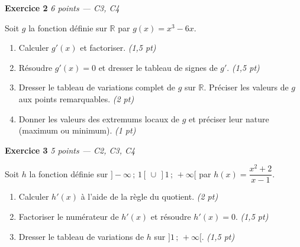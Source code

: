 \bigskip

\textbf{Exercice 2} \hfill \textit{6 points — C3, C4}

Soit $g$ la fonction définie sur $\mathbb{R}$ par $g(x) = x^3 - 6x$.

\begin{enumerate}
  \item Calculer $g'(x)$ et factoriser. \hfill \textit{(1,5 pt)}
  \item Résoudre $g'(x) = 0$ et dresser le tableau de signes de $g'$. \hfill \textit{(1,5 pt)}
  \item Dresser le tableau de variations complet de $g$ sur $\mathbb{R}$. Préciser les valeurs de $g$ aux points remarquables. \hfill \textit{(2 pt)}
  \item Donner les valeurs des extremums locaux de $g$ et préciser leur nature (maximum ou minimum). \hfill \textit{(1 pt)}
\end{enumerate}


\bigskip

\textbf{Exercice 3} \hfill \textit{5 points — C2, C3, C4}

Soit $h$ la fonction définie sur $]-\infty\,;\,1[\,\cup\,]1\,;\,+\infty[$ par $h(x) = \dfrac{x^2+2}{x-1}$.

\begin{enumerate}
  \item Calculer $h'(x)$ à l'aide de la règle du quotient. \hfill \textit{(2 pt)}
  \item Factoriser le numérateur de $h'(x)$ et résoudre $h'(x) = 0$. \hfill \textit{(1,5 pt)}
  \item Dresser le tableau de variations de $h$ sur $]1\,;\,+\infty[$. \hfill \textit{(1,5 pt)}
\end{enumerate}

